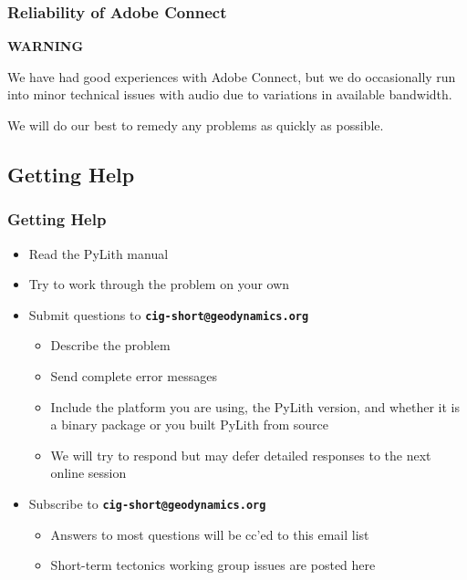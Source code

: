 \documentclass{beamer}
\newcommand{\important}[1]{{\bf\color{red}#1}}
\begin{document}
\begin{frame}
  \frametitle{Reliability of Adobe Connect}
  \summary{}
 
  \begin{center}
    {\Large\bf{\color{red} WARNING}}\\
  \end{center}

  We have had good experiences with Adobe Connect, but we do
  occasionally run into minor technical issues with audio due to
  variations in available bandwidth.

  \vspace{\baselineskip}

  We will do our best to remedy any problems as quickly as possible.

\end{frame}


\subsection{Getting Help}

\begin{frame}
  \frametitle{Getting Help}
  \summary{}
 
  \begin{itemize}
  \item Read the PyLith manual
  \item Try to work through the problem on your own
  \item Submit questions to \important{\tt cig-short@geodynamics.org}
    \begin{itemize}
    \item Describe the problem
    \item Send complete error messages
    \item Include the platform you are using, the PyLith version, and
      whether it is a binary package or you built PyLith from source
    \item We will try to respond but may defer detailed responses to
      the next online session
   \end{itemize}
  \item Subscribe to \important{\tt cig-short@geodynamics.org}
    \begin{itemize}
    \item Answers to most questions will be cc'ed to this email list
    \item Short-term tectonics working group issues are posted here
    \end{itemize}
  \end{itemize}

\end{frame}
\end{document}
